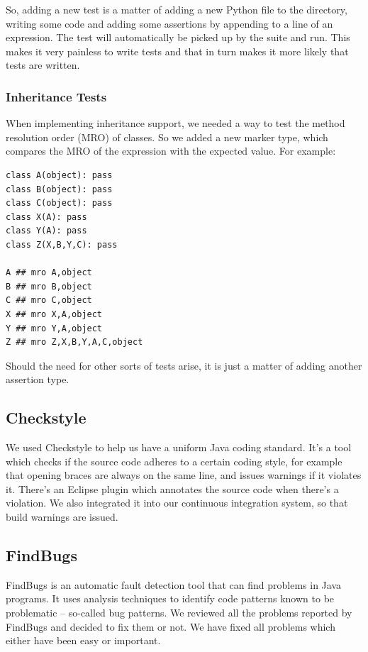 \documentclass[12pt,halfparskip,DIV11,BCOR10mm]{scrreprt}
\begin{document}
So, adding a new test is a matter of adding a new Python file to the directory, writing some code and adding some assertions by appending  to a line of an expression. The test will automatically be picked up by the suite and run. This makes it very painless to write tests and that in turn makes it more likely that tests are written.

\subsubsection{Inheritance Tests}

When implementing inheritance support, we needed a way to test the method resolution order (MRO) of classes. So we added a new marker type,  which compares the MRO of the expression with the expected value. For example:

\begin{lstlisting}
class A(object): pass
class B(object): pass
class C(object): pass
class X(A): pass
class Y(A): pass
class Z(X,B,Y,C): pass

A ## mro A,object
B ## mro B,object
C ## mro C,object
X ## mro X,A,object
Y ## mro Y,A,object
Z ## mro Z,X,B,Y,A,C,object
\end{lstlisting}

Should the need for other sorts of tests arise, it is just a matter of adding another assertion type.

\subsection{Checkstyle}

We used Checkstyle to help us have a uniform Java coding standard. It's a tool which checks if the source code adheres to a certain coding style, for example that opening braces are always on the same line, and issues warnings if it violates it. There's an Eclipse plugin which annotates the source code when there's a violation. We also integrated it into our continuous integration system, so that build warnings are issued.


\subsection{FindBugs}

FindBugs is an automatic fault detection tool that can find problems in Java programs. It uses analysis techniques to identify code patterns known to be problematic – so-called bug patterns. We reviewed all the problems reported by FindBugs and decided to fix them or not. We have fixed all problems which either have been easy or important.
\end{document}
